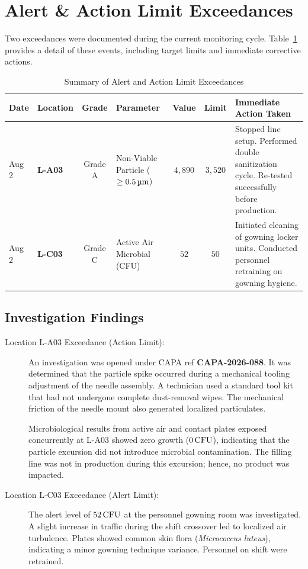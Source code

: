 \section{Alert \& Action Limit Exceedances}
Two exceedances were documented during the current monitoring cycle. Table~\ref{tab:exceedance_details} provides a detail of these events, including target limits and immediate corrective actions.

\begin{table}[h!]
\centering
\caption{Summary of Alert and Action Limit Exceedances}
\label{tab:exceedance_details}
\small
\begin{tabularx}{\textwidth}{p{1.2cm} p{1.2cm} c p{2cm} c c p{4.2cm}}
  \toprule
  \textbf{Date} & \textbf{Location} & \textbf{Grade} & \textbf{Parameter} & \textbf{Value} & \textbf{Limit} & \textbf{Immediate Action Taken} \\
  \midrule
  Aug 2 & \textbf{L-A03} & Grade A & Non-Viable Particle (\(\ge 0.5\,\um\)) & \(4,890\) & \(3,520\) & Stopped line setup. Performed double sanitization cycle. Re-tested successfully before production. \\
  \midrule
  Aug 2 & \textbf{L-C03} & Grade C & Active Air Microbial (CFU) & \(52\) & \(50\) & Initiated cleaning of gowning locker units. Conducted personnel retraining on gowning hygiene. \\
  \bottomrule
\end{tabularx}
\end{table}

\subsection{Investigation Findings}
\begin{description}
  \item[Location L-A03 Exceedance (Action Limit):] An investigation was opened under CAPA ref \textbf{CAPA-2026-088}. It was determined that the particle spike occurred during a mechanical tooling adjustment of the needle assembly. A technician used a standard tool kit that had not undergone complete dust-removal wipes. The mechanical friction of the needle mount also generated localized particulates.
  
  Microbiological results from active air and contact plates exposed concurrently at L-A03 showed zero growth (\(0\,\text{CFU}\)), indicating that the particle excursion did not introduce microbial contamination. The filling line was not in production during this excursion; hence, no product was impacted.
  
  \item[Location L-C03 Exceedance (Alert Limit):] The alert level of \(52\,\text{CFU}\) at the personnel gowning room was investigated. A slight increase in traffic during the shift crossover led to localized air turbulence. Plates showed common skin flora (\textit{Micrococcus luteus}), indicating a minor gowning technique variance. Personnel on shift were retrained.
\end{description}
